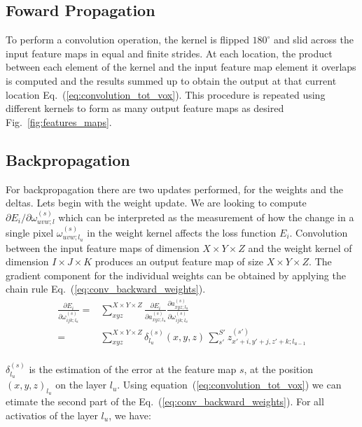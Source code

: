 \documentclass[final, paper=letter,5p,times,twocolumn]{elsarticle}
\begin{document}
\subsection{Foward Propagation}

To perform a convolution operation, the kernel is flipped $180^{\circ}$ and slid across the input feature maps in equal and finite strides. At each location, the product between each element of the kernel and the input feature map element it overlaps is computed and the results summed up to obtain the output at that current location Eq.~(\ref{eq:convolution_tot_vox}). This procedure is repeated using different kernels to form as many output feature maps as desired Fig.~\ref{fig:features_maps}.

\subsection{Backpropagation}

For backpropagation there are two updates performed, for the weights and the deltas. Lets begin with the weight update. We are looking to compute $\partial E_{i} / \partial \omega_{uvw;l}^{(s)}$ which can be interpreted as the measurement of how the change in a single pixel $\omega_{uvw;l_{u}}^{(s)}$ in the weight kernel affects the loss function $E_{i}$. Convolution between the input feature maps of dimension $X \times Y \times Z$  and the weight kernel of dimension $I \times J \times K$ produces an output feature map of size $X \times Y \times Z$. The gradient component for the individual weights can be obtained by applying the chain rule Eq.~(\ref{eq:conv_backward_weights}).\\


\begin{equation}
  \begin{split}
    \frac{\partial E_{i}}{\partial \omega_{ijk;l_{u}}^{(s)}} =& \sum_{xyz}^{X \times Y \times Z} \frac{\partial E_{i}}{\partial a_{xyz;l_{u}}^{(s)}}\frac{\partial a_{xyz;l_{u}}^{(s)}}{\partial \omega_{ijk;l_{u}}^{(s)}}  \\
    =& \sum_{xyz}^{X \times Y \times Z} \delta_{l_{u}}^{(s)}(x,y,z) \, \sum_{s'}^{S'} z_{x'+i,y'+j,z'+k;l_{u-1}}^{(s')} \\
  \end{split}
  \label{eq:conv_backward_weights} 
\end{equation}

$\delta_{l_{u}}^{(s)}$ is the estimation of the error at the feature map $s$, at the position $(x,y,z)_{l_{u}}$ on the layer $l_{u}$. Using equation~(\ref{eq:convolution_tot_vox}) we can etimate the second part of the Eq.~(\ref{eq:conv_backward_weights}). For all activatios of the layer $l_{u}$, we have:
\end{document}
